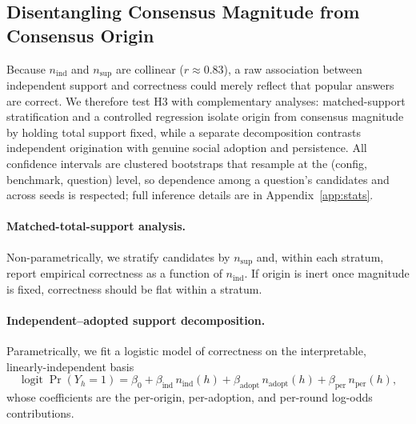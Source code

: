 \subsection{Disentangling Consensus Magnitude from Consensus Origin}
\label{subsec:consensus_decomposition}

Because $n_{\mathrm{ind}}$ and $n_{\mathrm{sup}}$ are collinear ($r\approx0.83$), a raw association between
independent support and correctness could merely reflect that popular answers are correct. We therefore
test H3 with complementary analyses: matched-support stratification and a controlled regression isolate
origin from consensus magnitude by holding total support fixed, while a separate decomposition contrasts
independent origination with genuine social adoption and persistence. All confidence intervals
are clustered bootstraps that resample at the (config, benchmark, question) level, so dependence among a
question's candidates and across seeds is respected; full inference details are in
Appendix~\ref{app:stats}.

\paragraph{Matched-total-support analysis.}
\label{par:matched_support}
Non-parametrically, we stratify candidates by $n_{\mathrm{sup}}$ and, within each stratum, report empirical
correctness as a function of $n_{\mathrm{ind}}$. If origin is inert once magnitude is fixed, correctness
should be flat within a stratum.

\paragraph{Independent--adopted support decomposition.}
\label{par:support_decomposition}
Parametrically, we fit a logistic model of correctness on the interpretable, linearly-independent basis
\begin{equation}
\operatorname{logit}\Pr(Y_h=1)=\beta_0+\beta_{\mathrm{ind}}\,n_{\mathrm{ind}}(h)+\beta_{\mathrm{adopt}}\,n_{\mathrm{adopt}}(h)+\beta_{\mathrm{per}}\,n_{\mathrm{per}}(h),
\label{eq:decomp}
\end{equation}
whose coefficients are the per-origin, per-adoption, and per-round log-odds contributions.

